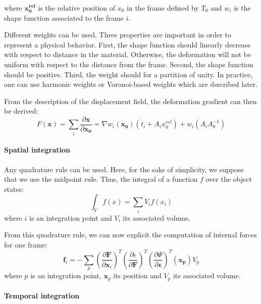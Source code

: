 where $\mathbf{x_{0}^{rel}}$ is the relative position of $x_{0}$ in the frame defined by $T_{0}$ and $w_{i}$ is the shape function associated to the frame $i$.

Different weights can be used. Three properties are important in order to represent a physical behavior. First, the shape function should linearly decrease with respect to distance in the material. Otherwise, the deformation will not be uniform with respect to the distance from the frame. Second, the shape function should be positive. Third, the weight should for a partition of unity. In practice, one can use harmonic weights or Voronoi-based weights which are described later.

From the description of the displacement field, the deformation gradient can then be derived:
\begin{equation}
\displaystyle
F\left(\mathbf{x}\right) = \sum_{i} \frac{\partial \mathbf{x}}{\partial \mathbf{x_{0}}} =
\nabla w_{i}(\mathbf{x_{0}}) \left( t_{i}+A_{i}x_{0}^{rel}\right) + 
w_{i}\left( A_{i}A_{0}^{-1} \right)
\end{equation}

\paragraph{Spatial integration}

Any quadrature rule can be used. Here, for the sake of simplicity, we suppose that we use the midpoint rule. Thus, the integral of a function $f$ over the object states:
\begin{equation}
\displaystyle
\int_{V} f(x)  = \sum_{i} V_{i} f(x_{i})
\end{equation}
where $i$ is an integration point and $V_{i}$ its associated volume.

From this quadrature rule, we can now explicit the computation of internal forces for one frame:
\begin{equation}
\label{eq:frameForceComputation}
\displaystyle
\mathbf{f}_{i} =
- \sum_{p}
\left( \frac{\partial \mathbf{F}}{\partial \mathbf{x}_{i}} \right)^{T}
\left( \frac{\partial \epsilon}{\partial \mathbf{F}} \right)^{T}
\left( \frac{\partial \Psi}{\partial \mathbf{\epsilon}} \right)^{T} \left(\mathbf{x_{p}}\right) V_{p} 
\end{equation}
where $p$ is an integration point, $\mathbf{x}_{p}$ its position and $V_{p}$ its associated volume.

\paragraph{Temporal integration}

